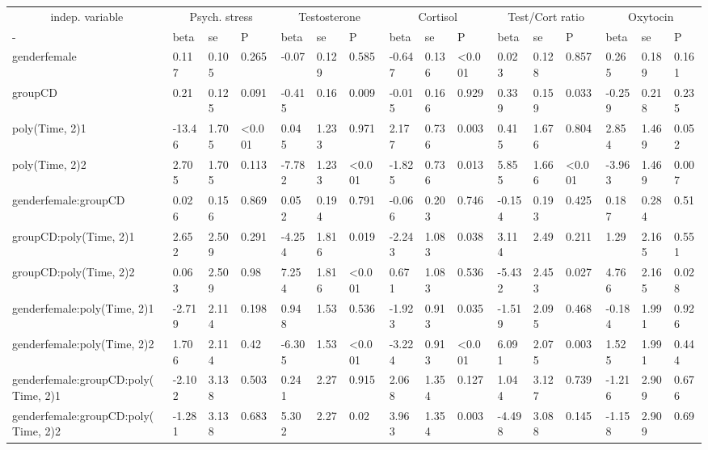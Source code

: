 \documentclass[
]{article}
\begin{document}
\begin{table}
\centering
\begin{tabular}[t]{l|l|l|l|l|l|l|l|l|l|l|l|l|l|l|l}
\hline
\multicolumn{1}{c|}{indep. variable} & \multicolumn{3}{c|}{Psych. stress} & \multicolumn{3}{c|}{Testosterone} & \multicolumn{3}{c|}{Cortisol} & \multicolumn{3}{c|}{Test/Cort ratio} & \multicolumn{3}{c}{Oxytocin} \\
\cline{1-1} \cline{2-4} \cline{5-7} \cline{8-10} \cline{11-13} \cline{14-16}
- & beta & se & P & beta & se & P & beta & se & P & beta & se & P & beta & se & P\\
\hline
genderfemale & 0.117 & 0.105 & 0.265 & -0.07 & 0.129 & 0.585 & -0.647 & 0.136 & <0.001 & 0.023 & 0.128 & 0.857 & 0.265 & 0.189 & 0.161\\
\hline
groupCD & 0.21 & 0.125 & 0.091 & -0.415 & 0.16 & 0.009 & -0.015 & 0.166 & 0.929 & 0.339 & 0.159 & 0.033 & -0.259 & 0.218 & 0.235\\
\hline
poly(Time, 2)1 & -13.46 & 1.705 & <0.001 & 0.045 & 1.233 & 0.971 & 2.177 & 0.736 & 0.003 & 0.415 & 1.676 & 0.804 & 2.854 & 1.469 & 0.052\\
\hline
poly(Time, 2)2 & 2.705 & 1.705 & 0.113 & -7.782 & 1.233 & <0.001 & -1.825 & 0.736 & 0.013 & 5.855 & 1.666 & <0.001 & -3.963 & 1.469 & 0.007\\
\hline
genderfemale:groupCD & 0.026 & 0.156 & 0.869 & 0.052 & 0.194 & 0.791 & -0.066 & 0.203 & 0.746 & -0.154 & 0.193 & 0.425 & 0.187 & 0.284 & 0.51\\
\hline
groupCD:poly(Time, 2)1 & 2.652 & 2.509 & 0.291 & -4.254 & 1.816 & 0.019 & -2.243 & 1.083 & 0.038 & 3.114 & 2.49 & 0.211 & 1.29 & 2.165 & 0.551\\
\hline
groupCD:poly(Time, 2)2 & 0.063 & 2.509 & 0.98 & 7.254 & 1.816 & <0.001 & 0.671 & 1.083 & 0.536 & -5.432 & 2.453 & 0.027 & 4.766 & 2.165 & 0.028\\
\hline
genderfemale:poly(Time, 2)1 & -2.719 & 2.114 & 0.198 & 0.948 & 1.53 & 0.536 & -1.923 & 0.913 & 0.035 & -1.519 & 2.095 & 0.468 & -0.184 & 1.991 & 0.926\\
\hline
genderfemale:poly(Time, 2)2 & 1.706 & 2.114 & 0.42 & -6.305 & 1.53 & <0.001 & -3.224 & 0.913 & <0.001 & 6.091 & 2.075 & 0.003 & 1.525 & 1.991 & 0.444\\
\hline
genderfemale:groupCD:poly(Time, 2)1 & -2.102 & 3.138 & 0.503 & 0.241 & 2.27 & 0.915 & 2.068 & 1.354 & 0.127 & 1.044 & 3.127 & 0.739 & -1.216 & 2.909 & 0.676\\
\hline
genderfemale:groupCD:poly(Time, 2)2 & -1.281 & 3.138 & 0.683 & 5.302 & 2.27 & 0.02 & 3.963 & 1.354 & 0.003 & -4.498 & 3.088 & 0.145 & -1.158 & 2.909 & 0.69\\
\hline
\end{tabular}
\end{table}
\end{document}
